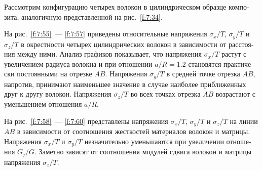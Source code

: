 \begin{russian}
Рассмотрим конфигурацию четырех волокон в цилиндрическом образце композита, аналогичную представленной на рис.~\ref{f:7:34}.


На рис.~\ref{f:7:55}~--- \ref{f:7:57} приведены относительные напряжения $\sigma_x/T$, $\sigma_y/T$ и $\sigma_z/T$ в окрестности четырех цилиндрических волокон в зависимости от расстояния между ними. Анализ графиков показывает, что напряжения $\sigma_x/T$ растут с увеличением радиуса волокна и при отношении $a/R=1.2$ становятся практически постоянными на отрезке $AB$. Напряжения $\sigma_y/T$ в средней точке отрезка $AB$, напротив, принимают наименьшее значение в случае наиболее приближенных друг к другу волокон. Напряжения $\sigma_z/T$ во всех точках отрезка $AB$ возрастают с уменьшением отношения $a/R$.

На рис.~\ref{f:7:58}~--- \ref{f:7:60} представлены напряжения $\sigma_x/T$, $\sigma_y/T$ и $\sigma_z/T$ на линии $AB$ в зависимости от соотношения жесткостей материалов волокон и матрицы. Напряжения $\sigma_x/T$ и $\sigma_y/T$ незначительно уменьшаются при увеличении отношения $G_j/G$. Заметно зависят от соотношения модулей сдвига волокон и матрицы напряжения $\sigma_z/T$.


%



\end{russian}
